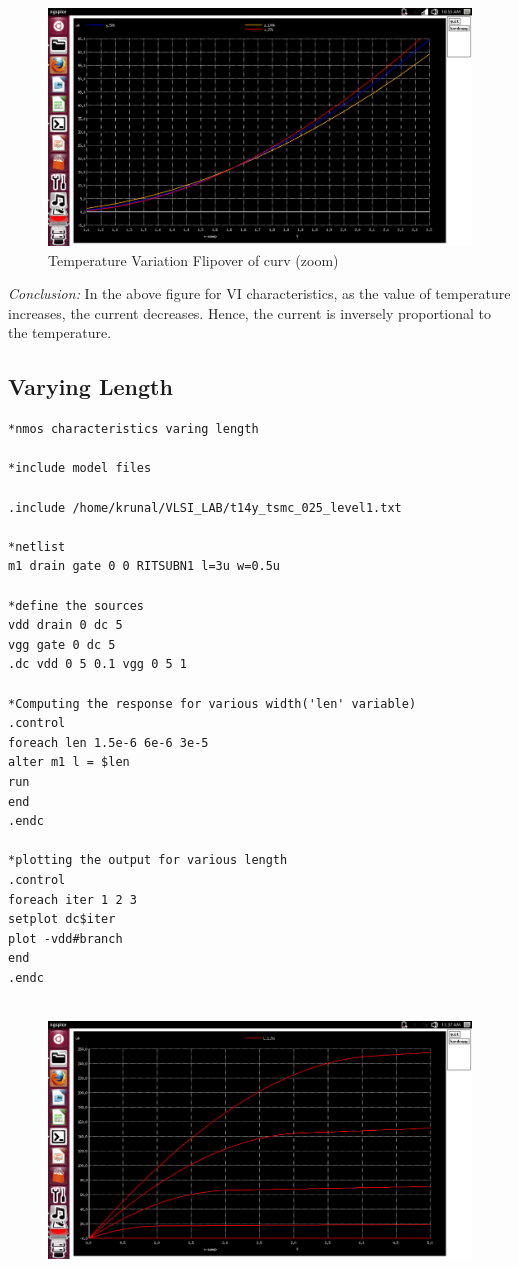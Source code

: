 \documentclass[12pt,a4paper]{article}
\begin{document}
\begin{center}
\begin{figure}[!ht]
\centering
\includegraphics[scale=0.37]{temp_vary_zoomed_pic2.png}

\caption[Short]{Temperature Variation Flipover of curv (zoom)}
\end{figure}
\textit{Conclusion:} In the above figure for VI characteristics, as the value of temperature increases, the current decreases. Hence, the current is inversely proportional to the temperature.
\\
\subsection{Varying Length}
\begin{lstlisting}
*nmos characteristics varing length

*include model files

.include /home/krunal/VLSI_LAB/t14y_tsmc_025_level1.txt

*netlist
m1 drain gate 0 0 RITSUBN1 l=3u w=0.5u

*define the sources
vdd drain 0 dc 5
vgg gate 0 dc 5
.dc vdd 0 5 0.1 vgg 0 5 1

*Computing the response for various width('len' variable)
.control
foreach len 1.5e-6 6e-6 3e-5
alter m1 l = $len
run 
end
.endc

*plotting the output for various length
.control
foreach iter 1 2 3
setplot dc$iter
plot -vdd#branch
end
.endc


\end{lstlisting}

\begin{figure}[!ht]
\centering
\includegraphics[scale=0.34]{vary_len_1_5.png}


\end{figure}
\end{center}
\end{document}
